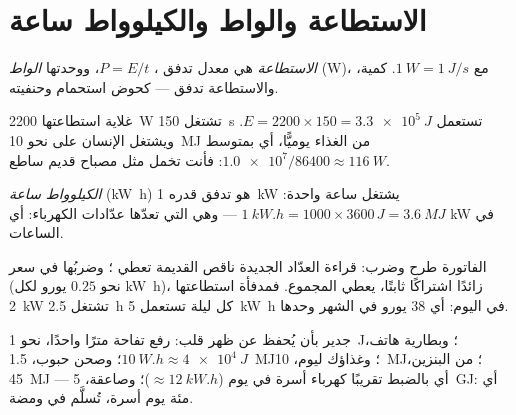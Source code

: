 \section{الاستطاعة والواط والكيلوواط ساعة}

\begin{definition}[الاستطاعة]\label{def:g10:energy-conservation:power}
\emph{الاستطاعة} هي معدل تدفق ،
$P = E/t$، ووحدتها \emph{الواط} (\unit{W})، مع
$\qty{1}{W} = \qty{1}{J/s}$.  كمية، والاستطاعة تدفق ---
كحوض استحمام وحنفيته.

\end{definition}

\begin{example}\label{ex:g10:energy-conservation:power}
غلاية استطاعتها \qty{2200}{W} تشتغل \qty{150}{s} تستعمل
$E = 2200 \times 150 = \qty{3.3e5}{J}$. ويشتغل الإنسان على نحو
\qty{10}{MJ} من الغذاء يوميًّا، أي بمتوسط
$\num{1.0e7}/\num{86400} \approx \qty{116}{W}$: فأنت تخمل مثل
مصباح قديم ساطع.
\end{example}

\begin{definition}\label{def:g10:energy-conservation:kwh}
\emph{الكيلوواط ساعة} (\unit{kW.h}) هو
 تدفق قدره \qty{1}{kW} يشتغل ساعة واحدة:
$\qty{1}{kW.h} = 1000 \times 3600\,\unit{J} = \qty{3.6}{MJ}$ ---
وهي  التي تعدّها عدّادات الكهرباء: أي   \unit{kW} في الساعات.
\end{definition}

\begin{example}\label{ex:g10:energy-conservation:bill}
الفاتورة طرح وضرب: قراءة العدّاد الجديدة
ناقص القديمة تعطي ؛ وضربُها في سعر  (نحو
$0.25$ يورو لكل \unit{kW.h})، زائدًا اشتراكًا ثابتًا، يعطي
المجموع. فمدفأة استطاعتها \qty{2}{kW} تشتغل \qty{2.5}{h} كل ليلة تستعمل
\qty{5}{kW.h} في اليوم: أي $38$ يورو في الشهر وحدها.
\end{example}

\begin{example}\label{ex:g10:energy-conservation:orders}
جدير بأن يُحفظ عن ظهر قلب: رفع تفاحة مترًا واحدًا، نحو \qty{1}{J}؛
وبطارية هاتف، $\qty{10}{W.h} \approx \qty{4e4}{J}$؛ وصحن حبوب،
\qty{1.5}{MJ}؛ وغذاؤك ليوم، \qty{10}{MJ}؛ 
من البنزين، \qty{45}{MJ} --- أي بالضبط تقريبًا كهرباء أسرة في يوم
($\approx \qty{12}{kW.h}$)؛ وصاعقة، \qty{5}{GJ}:
أي مئة يوم أسرة، تُسلَّم في ومضة.
\end{example}

